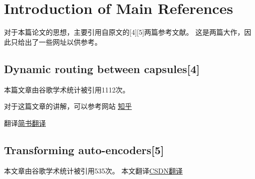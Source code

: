 \section{Introduction of Main References}

对于本篇论文的思想，主要引用自原文的[4][5]两篇参考文献。
这是两篇大作，因此只给出了一些网址以供参考。

\subsection{ Dynamic routing between capsules[4]}
本篇文章\cite{sabour2017dynamic}由谷歌学术统计被引用1112次。

对于这篇文章的讲解，可以参考网站
\href{https://www.zhihu.com/question/67287444?sort=created}{知乎}

翻译\href{https://www.jianshu.com/p/8d4eefae0444}{简书翻译}

\subsection{Transforming auto-encoders[5]}
本文章\cite{hinton2011transforming}由谷歌学术统计被引用535次。
本文翻译\href{https://blog.csdn.net/XinyanH/article/details/78735573}{CSDN翻译}

